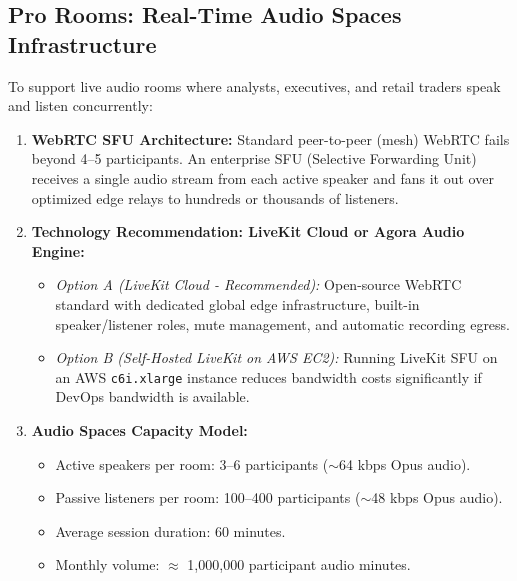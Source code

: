 \documentclass[11pt,a4paper]{article}
\begin{document}
\subsection{Pro Rooms: Real-Time Audio Spaces Infrastructure}
To support live audio rooms where analysts, executives, and retail traders speak and listen concurrently:
\begin{enumerate}
    \item \textbf{WebRTC SFU Architecture:}
    Standard peer-to-peer (mesh) WebRTC fails beyond 4--5 participants. An enterprise SFU (Selective Forwarding Unit) receives a single audio stream from each active speaker and fans it out over optimized edge relays to hundreds or thousands of listeners.
    \item \textbf{Technology Recommendation: LiveKit Cloud or Agora Audio Engine:}
    \begin{itemize}
        \item \textit{Option A (LiveKit Cloud - Recommended):} Open-source WebRTC standard with dedicated global edge infrastructure, built-in speaker/listener roles, mute management, and automatic recording egress.
        \item \textit{Option B (Self-Hosted LiveKit on AWS EC2):} Running LiveKit SFU on an AWS \texttt{c6i.xlarge} instance reduces bandwidth costs significantly if DevOps bandwidth is available.
    \end{itemize}
    \item \textbf{Audio Spaces Capacity Model:}
    \begin{itemize}
        \item Active speakers per room: 3--6 participants ($\sim$64 kbps Opus audio).
        \item Passive listeners per room: 100--400 participants ($\sim$48 kbps Opus audio).
        \item Average session duration: 60 minutes.
        \item Monthly volume: $\approx$ 1,000,000 participant audio minutes.
    \end{itemize}
\end{enumerate}
\end{document}
